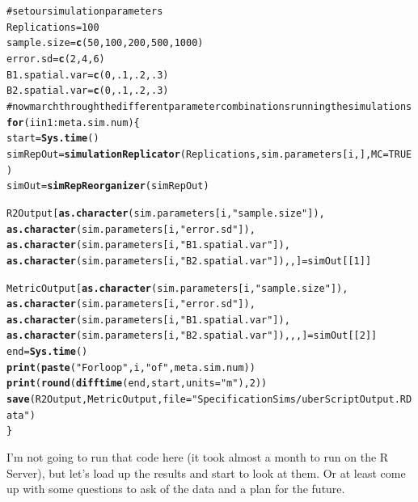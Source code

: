 \documentclass{article}\usepackage{graphicx, color}
\makeatletter
\newcommand{\hlfunctioncall}[1]{\textcolor[rgb]{0.501960784313725,0,0.329411764705882}{\textbf{#1}}}%
\newcommand{\hlstring}[1]{\textcolor[rgb]{0.6,0.6,1}{#1}}%
\newcommand{\hlcomment}[1]{\textcolor[rgb]{0.180392156862745,0.6,0.341176470588235}{#1}}%
\newenvironment{kframe}{%
 \def\at@end@of@kframe{}%
 \ifinner\ifhmode%
  \def\at@end@of@kframe{\end{minipage}}%
  \begin{minipage}{\columnwidth}%
 \fi\fi%
 \def\FrameCommand##1{\hskip\@totalleftmargin \hskip-\fboxsep
 \colorbox{shadecolor}{##1}\hskip-\fboxsep
     \hskip-\linewidth \hskip-\@totalleftmargin \hskip\columnwidth}%
 \MakeFramed {\advance\hsize-\width
   \@totalleftmargin\z@ \linewidth\hsize
   \@setminipage}}%
 {\par\unskip\endMakeFramed%
 \at@end@of@kframe}
\newenvironment{knitrout}{}{} %
\makeatother
\begin{document}
\begin{knitrout}
\color{fgcolor}\begin{kframe}
\begin{alltt}
\hlcomment{# set our simulation parameters}
Replications = 100
sample.size = \hlfunctioncall{c}(50, 100, 200, 500, 1000)
error.sd = \hlfunctioncall{c}(2, 4, 6)
B1.spatial.var = \hlfunctioncall{c}(0, .1, .2, .3)
B2.spatial.var = \hlfunctioncall{c}(0, .1, .2, .3)
\hlcomment{# now march through the different parameter combinations running the simulations}
\hlfunctioncall{for}( i in 1:meta.sim.num) \{ 
  start = \hlfunctioncall{Sys.time}()
  simRepOut = \hlfunctioncall{simulationReplicator}(Replications, sim.parameters[i, ], MC = TRUE)
  simOut = \hlfunctioncall{simRepReorganizer}(simRepOut)
  
  R2Output[\hlfunctioncall{as.character}(sim.parameters[i, \hlstring{"sample.size"}]),
           \hlfunctioncall{as.character}(sim.parameters[i, \hlstring{"error.sd"}]),
           \hlfunctioncall{as.character}(sim.parameters[i, \hlstring{"B1.spatial.var"}]),
           \hlfunctioncall{as.character}(sim.parameters[i, \hlstring{"B2.spatial.var"}]), , ] = simOut[[1]]
  
  MetricOutput[\hlfunctioncall{as.character}(sim.parameters[i, \hlstring{"sample.size"}]),
               \hlfunctioncall{as.character}(sim.parameters[i, \hlstring{"error.sd"}]),
               \hlfunctioncall{as.character}(sim.parameters[i, \hlstring{"B1.spatial.var"}]),
               \hlfunctioncall{as.character}(sim.parameters[i, \hlstring{"B2.spatial.var"}]), , , ] = simOut[[2]]
  end = \hlfunctioncall{Sys.time}()
  \hlfunctioncall{print}(\hlfunctioncall{paste}(\hlstring{"For loop"}, i,\hlstring{"of"}, meta.sim.num))
  \hlfunctioncall{print}(\hlfunctioncall{round}(\hlfunctioncall{difftime}(end, start, units = \hlstring{"m"}), 2))
  \hlfunctioncall{save}(R2Output, MetricOutput, file = \hlstring{"SpecificationSims/uberScriptOutput.RData"})
\}
\end{alltt}
\end{kframe}
\end{knitrout}


I'm not going to run that code here (it took almost a month to run on the R Server), but let's load up the results and start to look at them. Or at least come up with some questions to ask of the data and a plan for the future.
\end{document}

